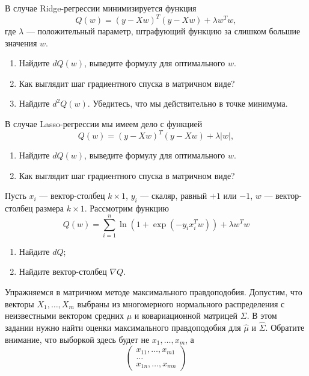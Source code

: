 \documentclass[12pt, a4paper, oneside]{article}
\theoremstyle{plain} %
\theoremstyle{definition}
\begin{document}
\begin{problem}{}
	В случае Ridge-регрессии минимизируется функция
	\[
	Q(w) = (y - Xw)^T(y - Xw) + \lambda w^T w,
	\]
	где $\lambda$ — положительный параметр, штрафующий функцию за слишком большие значения $w$.
	
	\begin{enumerate}
		\item Найдите $dQ(w)$, выведите формулу для оптимального $w$.
		\item Как выглядит шаг градиентного спуска в матричном виде?
		\item Найдите $d^2Q(w)$. Убедитесь, что мы действительно в точке минимума. 
	\end{enumerate}
	
	В случае Lasso-регрессии мы имеем дело с функцией
	\[
	Q(w) = (y - Xw)^T(y - Xw) + \lambda |w|,
	\]
	
	\begin{enumerate}
		\item Найдите $dQ(w)$, выведите формулу для оптимального $w$.
		\item Как выглядит шаг градиентного спуска в матричном виде?
	\end{enumerate}
\end{problem}

\begin{problem}{}
	
	Пусть $x_i$ — вектор-столбец $k\times 1$, $y_i$ — скаляр, равный $+1$ или $-1$, $w$ — вектор-столбец размера $k\times 1$. Рассмотрим функцию
	\[
	Q(w) = \sum_{i=1}^n \ln (1 + \exp(-y_ix_i^Tw)) + \lambda w^T w
	\]
	
	\begin{enumerate}
		\item Найдите $dQ$;
		\item Найдите вектор-столбец $\nabla Q$.
	\end{enumerate}
\end{problem}


\begin{problem}{}
	Упражняемся в матричном методе максимального правдоподобия.  Допустим, что векторы $X_1, \ldots, X_m$ выбраны из многомерного нормального распределения с неизвестными вектором средних $\mu$ и ковариационной матрицей $\Sigma$. В этом задании нужно найти оценки максимального правдоподобия для $\hat \mu$ и $\hat \Sigma$.  Обратите внимание, что выборкой здесь будет не $x_1, \ldots, x_m$, а 
	\begin{equation*}
	\begin{pmatrix}
	x_{11}, \ldots, x_{m1} \\
	\ldots  \\ 
	x_{1n}, \ldots, x_{mn}
	\end{pmatrix}
	\end{equation*}
\end{problem}
\end{document}
